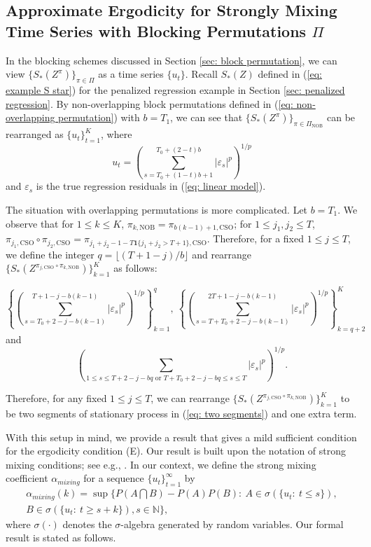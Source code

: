 \documentclass[final,12pt]{colt2018} %
\begin{document}
\subsection{Approximate Ergodicity for Strongly Mixing Time Series with Blocking Permutations $\Pi$}
\label{subsec: primitive conditions}

In the blocking schemes discussed in Section \ref{sec: block permutation}, we can view $\{S_*(Z^\pi) \}_{\pi\in \Pi} $ as a time series $\{u_t\} $. Recall $S_*(Z)$ defined in (\ref{eq: example S star}) for the penalized regression example in Section \ref{sec: penalized regression}. By non-overlapping block permutations defined in (\ref{eq: non-overlapping permutation}) with $b=T_1$, we can see that $\{S_*(Z^\pi) \}_{\pi\in\Pi_{\text{NOB} } } $ can be rearranged as $\{u_t\}_{t=1}^K $, where 
$$
u_t=  \left(\sum_{s=T_0+(1-t)b+1}^{T_0+(2-t)b} \left|{\varepsilon}_{s} \right|^p\right)^{1/p}
$$
and $\varepsilon_s$ is the true regression residuals in (\ref{eq: linear model}). 

The situation with overlapping permutations is more complicated. Let $b=T_1$. We observe that for $1\leq k\leq K$, $\pi_{k,\text{NOB}}=\pi_{b(k-1)+1,\text{CSO}} $; for $1\leq j_1,j_2\leq T$, $\pi_{j_1,\text{CSO}}\circ \pi_{j_2,\text{CSO}}=\pi_{j_1+j_2-1-T\mathbf{1}\{j_1+j_2>T+1\},\text{CSO}} $. Therefore, for a fixed $1\leq j\leq T$, we define the  integer $q=  \lfloor (T+1-j)/b \rfloor $  and rearrange $\{S_*(Z^{\pi_{j,\text{CSO}}\circ \pi_{k,\text{NOB}}  })\}_{k=1}^K $ as follows: 

\begin{equation} \label{eq: two segments}
\left\{\left(\sum_{s=T_0+2-j-b(k-1)}^{T+1-j-b(k-1)} \left|{\varepsilon}_{s} \right|^p\right)^{1/p} \right\}_{k=1}^{q},\ \left\{\left(\sum_{s=T+T_0+2-j-b(k-1)}^{2T+1-j-b(k-1)} \left|{\varepsilon}_{s} \right|^p\right)^{1/p} \right\}_{k=q+2}^{K} 
\end{equation}
and 
$$
\left(\sum_{1\leq s \leq T+2-j-bq \text{ or } T+T_0+2-j-bq\leq s\leq T } \left|{\varepsilon}_{s} \right|^p\right)^{1/p}.
$$

Therefore, for any fixed $1\leq j\leq T$, we can rearrange $\{S_*(Z^{\pi_{j,\text{CSO}}\circ \pi_{k,\text{NOB}}  })\}_{k=1}^K $ to be two segments of stationary process in (\ref{eq: two segments}) and one extra term.

With this setup in mind, we provide a result that gives a mild sufficient condition for the ergodicity condition (E). Our result is built upon the notation of strong mixing conditions; see e.g., \cite{bradley2007introduction,rio2017asymptotic}. In our context, we define the strong mixing coefficient $\alpha_{mixing} $ for a sequence $\{u_t\}_{t=1}^{\infty} $ by
\begin{multline*}
 \alpha_{mixing}(k)= \sup \{P(A\bigcap B)-P(A)P(B):\ A\in \sigma(\{u_t:\ t\leq s\}), \\
 B \in \sigma(\{u_t:\ t\geq s+k\}), s\in \mathbb{N} \},
\end{multline*}
where $\sigma(\cdot)$ denotes the $\sigma$-algebra generated by random variables. Our formal result is stated as follows.
\end{document}
